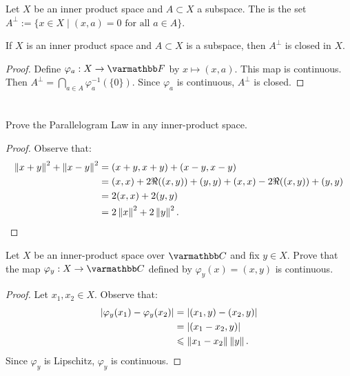 \begin{definition}
    Let $X$ be an inner product space and $A \subset X$ a subspace. The   is the set $A^\perp := \{x \in X \mid (x,a) = 0 \text{ for all }a \in A\}$.
\end{definition}

\begin{proposition}
    If $X$ is an inner product space and $A \subset X$ is a subspace, then $A^\perp$ is closed in $X$.
\end{proposition}
    \begin{proof}
        Define $\varphi_a :X \rightarrow \bfF$ by $x \mapsto (x,a)$. This map is continuous. Then $A^\perp = \bigcap_{a \in A}\varphi_a^{-1}(\{0\})$. Since $\varphi_a$ is continuous, $A^\perp$ is closed.
    \end{proof}

\section*{}

\begin{exercise}\label{exercise:parallelogram-law}
    Prove the Parallelogram Law in any inner-product space.
\end{exercise}
    \begin{proof}
        Observe that:
            \begin{equation*}
            \begin{split}
                \left\lVert x+y \right\rVert^2 +\left\lVert x-y \right\rVert^2
                & = (x+y,x+y) + (x-y,x-y) \\
                & = (x,x) + 2\Re((x,y)) + (y,y) + (x,x) - 2\Re((x,y)) + (y,y) \\
                & = 2(x,x) + 2(y,y) \\
                & = 2 \left\lVert x \right\rVert^2 + 2 \left\lVert y \right\rVert^2. \qedhere
            \end{split}
            \end{equation*}
    \end{proof}

\begin{exercise}
Let $X$ be an inner-product space over $\bfC$ and fix $y \in X$. Prove that the map $\varphi_y:X \rightarrow \bfC$ defined by $\varphi_y(x) = (x,y)$ is continuous.
\end{exercise}
    \begin{proof}
        Let $x_1,x_2 \in X$. Observe that:
            \begin{equation*}
            \begin{split}
                |\varphi_y(x_1) - \varphi_y(x_2)| 
                & = |(x_1,y) - (x_2,y)| \\
                & = |(x_1-x_2,y)| \\
                & \leqslant \left\lVert x_1 - x_2 \right\rVert \left\lVert y \right\rVert.
            \end{split}
            \end{equation*}
        Since $\varphi_y$ is Lipschitz, $\varphi_y$ is continuous.
    \end{proof}

